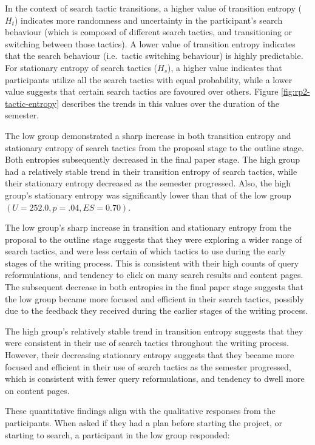 \documentclass[letterpaper, nobind]{templates/ociamthesis}
\begin{document}
In the context of search tactic transitions, a higher value of transition entropy (\(H_t\)) indicates more randomness and uncertainty in the participant's search behaviour (which is composed of different search tactics, and transitioning or switching between those tactics).
A lower value of transition entropy indicates that the search behaviour (i.e.~tactic switching behaviour) is highly predictable.
For stationary entropy of search tactics (\(H_s\)), a higher value indicates that participants utilize all the search tactics with equal probability, while a lower value suggests that certain search tactics are favoured over others.
Figure \ref{fig:rp2-tactic-entropy} describes the trends in this values over the duration of the semester.

The low group demonstrated a sharp increase in both transition entropy and stationary entropy of search tactics from the proposal stage to the outline stage.
Both entropies subsequently decreased in the final paper stage.
The high group had a relatively stable trend in their transition entropy of search tactics, while their stationary entropy decreased as the semester progressed.
Also, the high group's stationary entropy was significantly lower than that of the low group \((U = 252.0, p = .04, ES = 0.70)\).

The low group's sharp increase in transition and stationary entropy from the proposal to the outline stage suggests that they were exploring a wider range of search tactics, and were less certain of which tactics to use during the early stages of the writing process.
This is consistent with their high counts of query reformulations, and tendency to click on many search results and content pages.
The subsequent decrease in both entropies in the final paper stage suggests that the low group became more focused and efficient in their search tactics, possibly due to the feedback they received during the earlier stages of the writing process.

The high group's relatively stable trend in transition entropy suggests that they were consistent in their use of search tactics throughout the writing process.
However, their decreasing stationary entropy suggests that they became more focused and efficient in their use of search tactics as the semester progressed, which is consistent with fewer query reformulations, and tendency to dwell more on content pages.

These quantitative findings align with the qualitative responses from the participants.
When asked if they had a plan before starting the project, or starting to search, a participant in the low group responded:
\end{document}
